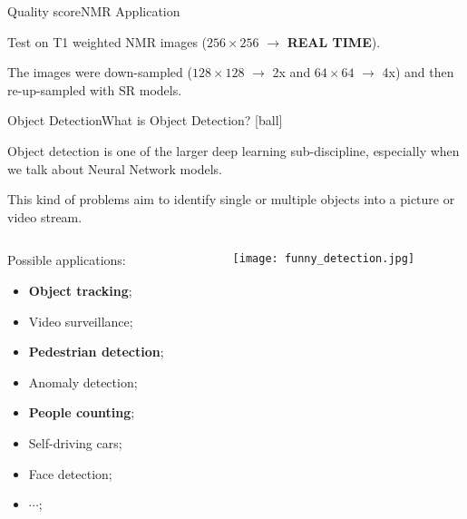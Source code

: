 \documentclass{standalone}
\begin{document}
\begin{frame}{Quality score}{NMR Application}

  \scriptsize{Test on T1 weighted NMR images ($256\times 256$ $\rightarrow$ \textbf{REAL TIME}).}

  \scriptsize{The images were down-sampled ($128\times 128$ $\rightarrow$ 2x and $64\times 64$ $\rightarrow$ 4x) and then re-up-sampled with SR models.}

  \begin{figure}

    \begin{overprint}
      \centering\def\svgwidth{\linewidth}
      \centering\def\svgwidth{\linewidth}
    \end{overprint}

  \end{figure}

\end{frame}



\begin{frame}{Object Detection}{What is Object Detection?}
  [ball]

  \scriptsize{Object detection is one of the larger deep learning sub-discipline, especially when we talk about Neural Network models.}

  \scriptsize{This kind of problems aim to identify single or multiple objects into a picture or video stream.}

  \vspace{1cm}

  \begin{columns}
    \begin{column}{0.5\textwidth}
      \scriptsize{Possible applications:}

      \begin{itemize}
        \item \textbf{Object tracking};
        \item Video surveillance;
        \item \textbf{Pedestrian detection};
        \item Anomaly detection;
        \item \textbf{People counting};
        \item Self-driving cars;
        \item Face detection;
        \item $\cdots$;
      \end{itemize}

    \end{column}
    \begin{column}{0.5\textwidth}
      \texttt{[image: funny\_detection.jpg]}
    \end{column}
  \end{columns}
\end{frame}
\end{document}
